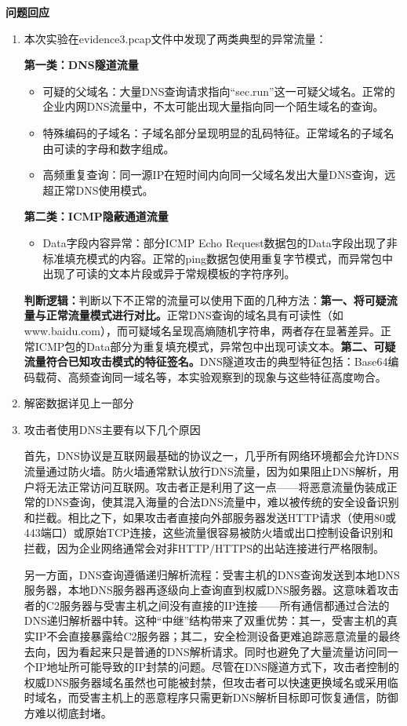 \documentclass[12pt]{ctexart}
\begin{document}
	\textbf{问题回应}
	\begin{enumerate}
		\item 本次实验在evidence3.pcap文件中发现了两类典型的异常流量：
		
		\textbf{第一类：DNS隧道流量}
		\begin{itemize}
			\item 可疑的父域名：大量DNS查询请求指向“sec.run”这一可疑父域名。正常的企业内网DNS流量中，不太可能出现大量指向同一个陌生域名的查询。
			
			\item 特殊编码的子域名：子域名部分呈现明显的乱码特征。正常域名的子域名由可读的字母和数字组成。
			
			\item 高频重复查询：同一源IP在短时间内向同一父域名发出大量DNS查询，远超正常DNS使用模式。
		\end{itemize}
		\textbf{第二类：ICMP隐蔽通道流量}
		\begin{itemize}
			\item Data字段内容异常：部分ICMP Echo Request数据包的Data字段出现了非标准填充模式的内容。正常的ping数据包使用重复字节模式，而异常包中出现了可读的文本片段或异于常规模板的字符序列。
		\end{itemize}

		\textbf{判断逻辑：}判断以下不正常的流量可以使用下面的几种方法：\textbf{第一、将可疑流量与正常流量模式进行对比。}正常DNS查询的域名具有可读性（如www.baidu.com），而可疑域名呈现高熵随机字符串，两者存在显著差异。正常ICMP包的Data部分为重复填充模式，异常包中出现可读文本。\textbf{第二、可疑流量符合已知攻击模式的特征签名。}DNS隧道攻击的典型特征包括：Base64编码载荷、高频查询同一域名等，本实验观察到的现象与这些特征高度吻合。
		\item 解密数据详见上一部分
		\item 攻击者使用DNS主要有以下几个原因
		
		\hspace*{2em}首先，DNS协议是互联网最基础的协议之一，几乎所有网络环境都会允许DNS流量通过防火墙。防火墙通常默认放行DNS流量，因为如果阻止DNS解析，用户将无法正常访问互联网。攻击者正是利用了这一点——将恶意流量伪装成正常的DNS查询，使其混入海量的合法DNS流量中，难以被传统的安全设备识别和拦截。相比之下，如果攻击者直接向外部服务器发送HTTP请求（使用80或443端口）或原始TCP连接，这些流量很容易被防火墙或出口控制设备识别和拦截，因为企业网络通常会对非HTTP/HTTPS的出站连接进行严格限制。
		
		\hspace*{2em}另一方面，DNS查询遵循递归解析流程：受害主机的DNS查询发送到本地DNS服务器，本地DNS服务器再逐级向上查询直到权威DNS服务器。这意味着攻击者的C2服务器与受害主机之间没有直接的IP连接——所有通信都通过合法的DNS递归解析器中转。这种“中继”结构带来了双重优势：其一，受害主机的真实IP不会直接暴露给C2服务器；其二，安全检测设备更难追踪恶意流量的最终去向，因为看起来只是普通的DNS解析请求。同时也避免了大量流量访问同一个IP地址所可能导致的IP封禁的问题。尽管在DNS隧道方式下，攻击者控制的权威DNS服务器域名虽然也可能被封禁，但攻击者可以快速更换域名或采用临时域名，而受害主机上的恶意程序只需更新DNS解析目标即可恢复通信，防御方难以彻底封堵。
	\end{enumerate}
\end{document}
